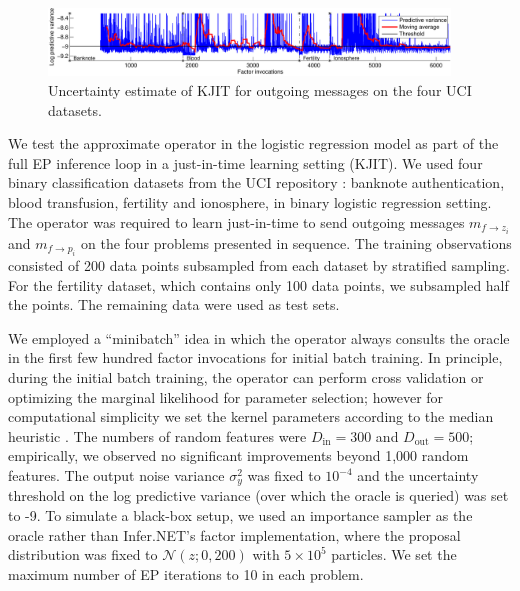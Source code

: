 \documentclass[english]{article}
\theoremstyle{plain}
\theoremstyle{plain}
\newcommand{\factor}{f}				%
\newcommand{\msg}[2]{m_{#1 \rightarrow #2}}			%
\begin{document}
\begin{figure}[t]
\centering
\includegraphics[width=0.95\textwidth]{online/uci_temporal_uncertainty-crop}
\caption{
Uncertainty estimate of KJIT for outgoing messages on the four UCI datasets.
\label{fig:uci_temporal_uncertainty}
}
\end{figure}




We test the approximate operator in the logistic regression
model as part of the full EP inference loop in a just-in-time learning setting
(KJIT). We used four binary classification datasets from the UCI repository
\citep{Lichm2013}: banknote authentication, blood transfusion, fertility and
ionosphere, in binary logistic regression setting. The
operator was required to learn just-in-time to send outgoing messages
$\msg{\factor}{z_i}$ and $\msg{\factor}{p_i}$ on the four problems presented in
sequence. The training observations consisted of 200 data points subsampled
from each dataset by stratified sampling.  For the fertility dataset, which
contains only 100 data points, we subsampled half the points. The remaining
data were used as test sets. 

We employed a ``minibatch'' idea in which the operator always consults the oracle in
the first few hundred factor invocations for initial batch training. 
In principle, during the initial batch training, the operator can perform 
cross validation or optimizing the marginal likelihood for parameter selection;
however for computational simplicity we set the kernel parameters according to
the median heuristic
\citep{Scholkopf2002}. 
The numbers 
of random features were $D_\mathrm{in} = 300$ and $D_\mathrm{out} = 500$; empirically, we observed
no significant improvements beyond 1,000 random features. The
output noise variance 
$\sigma^2_y$ was fixed to $10^{-4}$ and the uncertainty threshold on the log 
predictive variance (over which the oracle is queried) was set to -9. To
simulate a black-box setup, we used
an importance sampler as the oracle rather than Infer.NET's factor implementation, 
where the proposal distribution was fixed to $\mathcal{N}(z; 0, 200)$ with 
$5 \times 10^5$ particles. We set the
maximum number of EP iterations to 10 in each problem.
\end{document}
